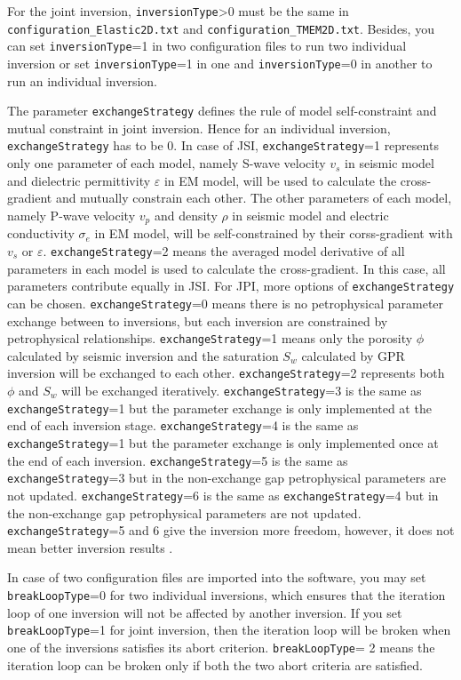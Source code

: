 \documentclass[pdftex,a4paper,parskip,listof=totoc,bibliography=totoc,onehalfspacing,12pt]{scrreprt}
\newcommand{\shellcmd}[1]{\indent\indent\texttt{#1}}	%
\begin{document}
For the joint inversion, \verb+inversionType+>0 must be the same in \shellcmd{configuration\_Elastic2D.txt} and \shellcmd{configuration\_TMEM2D.txt}. Besides, you can set \verb+inversionType+=1 in two configuration files to run two individual inversion or set \verb+inversionType+=1 in one and \verb+inversionType+=0 in another to run an individual inversion.

The parameter \verb+exchangeStrategy+ defines the rule of model self-constraint and mutual constraint in joint inversion. Hence for an individual inversion, \verb+exchangeStrategy+ has to be 0. In case of JSI, \verb+exchangeStrategy+=1 represents only one parameter of each model, namely S-wave velocity $v_s$ in seismic model and dielectric permittivity $\varepsilon$ in EM model, will be used to calculate the cross-gradient and mutually constrain each other. The other parameters of each model, namely P-wave velocity $v_p$ and density $\rho$ in seismic model and electric conductivity $\sigma_e$ in EM model, will be self-constrained by their corss-gradient with $v_s$ or $\varepsilon$. \verb+exchangeStrategy+=2 means the averaged model derivative of all parameters in each model is used to calculate the cross-gradient. In this case, all parameters contribute equally in JSI. For JPI, more options of \verb+exchangeStrategy+ can be chosen. \verb+exchangeStrategy+=0 means there is no petrophysical parameter exchange between to inversions, but each inversion are constrained by petrophysical relationships. \verb+exchangeStrategy+=1 means only the porosity $\phi$ calculated by seismic inversion and the saturation $S_w$ calculated by GPR inversion will be exchanged to each other. \verb+exchangeStrategy+=2 represents both $\phi$ and $S_w$ will be exchanged iteratively. \verb+exchangeStrategy+=3 is the same as \verb+exchangeStrategy+=1 but the parameter exchange is only implemented at the end of each inversion stage. \verb+exchangeStrategy+=4 is the same as \verb+exchangeStrategy+=1 but the parameter exchange is only implemented once at the end of each inversion. \verb+exchangeStrategy+=5 is the same as \verb+exchangeStrategy+=3 but in the non-exchange gap petrophysical parameters are not updated. \verb+exchangeStrategy+=6 is the same as \verb+exchangeStrategy+=4 but in the non-exchange gap petrophysical parameters are not updated. \verb+exchangeStrategy+=5 and 6 give the inversion more freedom, however, it does not mean better inversion results \cite{qin2021joint}.

In case of two configuration files are imported into the software, you may set \verb+breakLoopType+=0 for two individual inversions, which ensures that the iteration loop of one inversion will not be affected by another inversion. If you set \verb+breakLoopType+=1 for joint inversion, then the iteration loop will be broken when one of the inversions satisfies its abort criterion. \verb+breakLoopType+= 2 means the iteration loop can be broken only if both the two abort criteria are satisfied.
\end{document}
